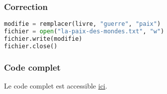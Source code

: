\documentclass[svgnames,11pt]{beamer}
\begin{document}
\begin{frame}[fragile]
    \frametitle{Correction}

\begin{center}
\begin{lstlisting}[language=Python , basicstyle=\small, xleftmargin=2em, xrightmargin=2em]
modifie = remplacer(livre, "guerre", "paix")
fichier = open("la-paix-des-mondes.txt", "w")
fichier.write(modifie)
fichier.close()
\end{lstlisting}
\label{CODE}
\end{center}

\end{frame}
\begin{frame}
    \frametitle{Code complet}

    Le code complet est accessible \href{https://cviroulaud.github.io/terminale/algorithmique/boyer-moore/chercher-remplacer/scripts/chercher-remplacer.zip}{ici}.

\end{frame}
\end{document}
